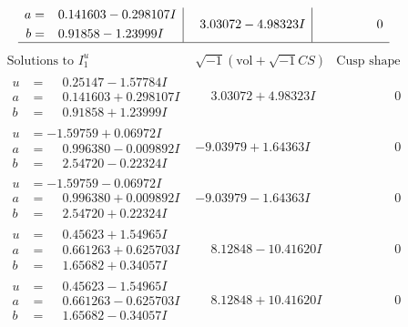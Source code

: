 \documentclass[1p]{elsarticle_modified}
\theoremstyle{definition}
\newcommand{\I}{\sqrt{-1}}
\begin{document}
$$\begin{array}{c|c|c}
\begin{aligned}
a &= \phantom{-}0.141603 - 0.298107 I \\
b &= \phantom{-}0.91858 - 1.23999 I\end{aligned}
 & \phantom{-}3.03072 - 4.98323 I & \phantom{-0.000000 } 0\\
 \hline 
 \end{array}$$\newpage$$\begin{array}{c|c|c}  
\text{Solutions to }I^u_{1}& \I (\text{vol} + \sqrt{-1}CS) & \text{Cusp shape}\\
 \hline 
\begin{aligned}
u &= \phantom{-}0.25147 - 1.57784 I \\
a &= \phantom{-}0.141603 + 0.298107 I \\
b &= \phantom{-}0.91858 + 1.23999 I\end{aligned}
 & \phantom{-}3.03072 + 4.98323 I & \phantom{-0.000000 } 0 \\ \hline\begin{aligned}
u &= -1.59759 + 0.06972 I \\
a &= \phantom{-}0.996380 - 0.009892 I \\
b &= \phantom{-}2.54720 - 0.22324 I\end{aligned}
 & -9.03979 + 1.64363 I & \phantom{-0.000000 } 0 \\ \hline\begin{aligned}
u &= -1.59759 - 0.06972 I \\
a &= \phantom{-}0.996380 + 0.009892 I \\
b &= \phantom{-}2.54720 + 0.22324 I\end{aligned}
 & -9.03979 - 1.64363 I & \phantom{-0.000000 } 0 \\ \hline\begin{aligned}
u &= \phantom{-}0.45623 + 1.54965 I \\
a &= \phantom{-}0.661263 + 0.625703 I \\
b &= \phantom{-}1.65682 + 0.34057 I\end{aligned}
 & \phantom{-}8.12848 - 10.41620 I & \phantom{-0.000000 } 0 \\ \hline\begin{aligned}
u &= \phantom{-}0.45623 - 1.54965 I \\
a &= \phantom{-}0.661263 - 0.625703 I \\
b &= \phantom{-}1.65682 - 0.34057 I\end{aligned}
 & \phantom{-}8.12848 + 10.41620 I & \phantom{-0.000000 } 0 \\ \hline\begin{aligned}

\end{aligned}
\end{array}$$
\end{document}

